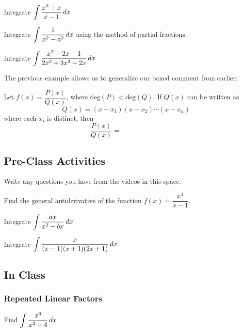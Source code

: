 \documentclass[notes]{subfiles}
\begin{document}
		\begin{ex}
			Integrate $\displaystyle \int \dfrac{x^3 + x}{x-1}\, dx$
		\end{ex}
			\newpage
		
		\begin{ex}
			Integrate $\displaystyle \int \dfrac{1}{x^2-a^2}\, dx$ using the method of partial fractions.
		\end{ex}	
			
		\begin{ex}
			Integrate $\displaystyle \int \dfrac{x^2+2x-1}{2x^3+3x^2-2x}\, dx$
		\end{ex}
			\newpage
			
		The previous example allows us to generalize our boxed comment from earlier:
		\begin{rmk}
			Let $f(x) = \dfrac{P(x)}{Q(x)}$, where $\text{deg}(P) < \text{deg}(Q)$.  If $Q(x)$ can be written as 
				\[Q(x) = (x-x_1)(x-x_2)\cdots(x-x_n)\]
			where each $x_i$ is distinct, then 
				\[\dfrac{P(x)}{Q(x)} = \qquad \qquad\qquad\]
		\end{rmk}
		\newsec
	\subsection*{Pre-Class Activities}
		\begin{ex}
			Write any questions you have from the videos in this space.
		\end{ex}
		\begin{ex}
			Find the general antiderivative of the function $f(x) = \dfrac{x^4}{x-1}$.
		\end{ex}
			\newpage
		
		\begin{ex}
			Integrate $\displaystyle \int \dfrac{ax}{x^2-bx}\, dx$
		\end{ex}
			
		\begin{ex}
			Integrate $\displaystyle \int \dfrac{x}{(x-1)(x+1)(2x+1)}\, dx$
		\end{ex}
			\newpage
			
	\subsection*{In Class}
	\subsubsection*{Repeated Linear Factors}
		\begin{ex}
			Find $\displaystyle \int \dfrac{x^6}{x^2-4}\, dx$
		\end{ex}
			
\end{document}
